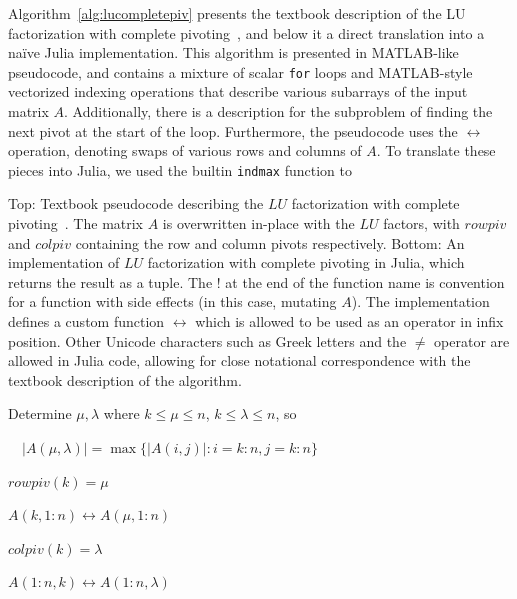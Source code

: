 Algorithm~\ref{alg:lucompletepiv} presents the textbook description of the LU
factorization with complete pivoting~\cite[Algorithm 3.4.3 (Outer Product LU
with Complete Pivoting), p. 132]{Golub2013}, and below it a direct translation
into a na\"ive Julia implementation. This algorithm is presented in MATLAB-like
pseudocode, and contains a mixture of scalar \lstinline|for| loops and
MATLAB-style vectorized indexing operations that describe various subarrays of
the input matrix $A$. Additionally, there is a description for the subproblem
of finding the next pivot at the start of the loop. Furthermore, the pseudocode
uses the $\leftrightarrow$ operation, denoting swaps of various rows and
columns of $A$. To translate these pieces into Julia, we used the builtin
\lstinline|indmax| function to

\begin{algorithm}

\caption{Top: Textbook pseudocode describing the $LU$ factorization with
complete pivoting~\cite[Algorithm 3.4.3 (Outer Product LU with Complete
Pivoting), p. 132]{Golub2013}. The matrix $A$ is overwritten in-place with the
$LU$ factors, with $rowpiv$ and $colpiv$ containing the row and column pivots
respectively.
Bottom: An implementation of $LU$ factorization with complete pivoting in Julia,
which returns the result as a tuple. The ! at the end of the function name is
convention for a function with side effects (in this case, mutating $A$). The
implementation defines a custom function $\leftrightarrow$ which is allowed to
be used as an operator in infix position. Other Unicode characters such as
Greek letters and the $\ne$ operator are allowed in Julia code, allowing for
close notational correspondence with the textbook description of the algorithm.}
\label{alg:lucompletepiv}

\begin{algorithmic}

    Determine $\mu, \lambda$ where $k \le \mu \le n$,  $k \le \lambda \le n$, so

    $\quad\left|A(\mu, \lambda)\right| = \max\{ \left|A(i, j)\right| : i=k:n, j=k:n \}$

    $rowpiv(k) = \mu$

    $A(k, 1:n) \leftrightarrow A(\mu, 1:n)$

    $colpiv(k) = \lambda$

    $A(1:n, k) \leftrightarrow A(1:n, \lambda)$



\end{algorithmic}
\end{algorithm}
